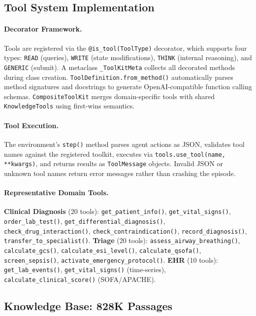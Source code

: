 \documentclass{article}
\begin{document}
\subsection{Tool System Implementation}

\paragraph{Decorator Framework.}
Tools are registered via the \texttt{@is\_tool(ToolType)} decorator, which supports four types: \texttt{READ} (queries), \texttt{WRITE} (state modifications), \texttt{THINK} (internal reasoning), and \texttt{GENERIC} (submit). A metaclass \texttt{\_ToolKitMeta} collects all decorated methods during class creation. \texttt{ToolDefinition.from\_method()} automatically parses method signatures and docstrings to generate OpenAI-compatible function calling schemas. \texttt{CompositeToolKit} merges domain-specific tools with shared \texttt{KnowledgeTools} using first-wins semantics.

\paragraph{Tool Execution.}
The environment's \texttt{step()} method parses agent actions as JSON, validates tool names against the registered toolkit, executes via \texttt{tools.use\_tool(name, **kwargs)}, and returns results as \texttt{ToolMessage} objects. Invalid JSON or unknown tool names return error messages rather than crashing the episode.

\paragraph{Representative Domain Tools.}
\textbf{Clinical Diagnosis} (20 tools): \texttt{get\_patient\_info()}, \texttt{get\_vital\_signs()}, \texttt{order\_lab\_test()}, \texttt{get\_differential\_diagnosis()}, \texttt{check\_drug\_interaction()}, \texttt{check\_contraindication()}, \texttt{record\_diagnosis()}, \texttt{transfer\_to\_specialist()}.
\textbf{Triage} (20 tools): \texttt{assess\_airway\_breathing()}, \texttt{calculate\_gcs()}, \texttt{calculate\_esi\_level()}, \texttt{calculate\_qsofa()}, \texttt{screen\_sepsis()}, \texttt{activate\_emergency\_protocol()}.
\textbf{EHR} (10 tools): \texttt{get\_lab\_events()}, \texttt{get\_vital\_signs()} (time-series), \texttt{calculate\_clinical\_score()} (SOFA/APACHE).

\subsection{Knowledge Base: 828K Passages}
\end{document}
